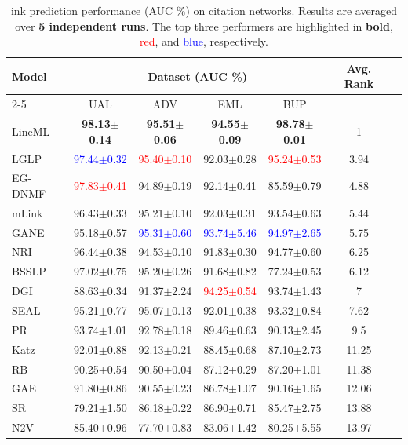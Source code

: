 \documentclass[pdflatex,sn-mathphys-num]{sn-jnl}%
\theoremstyle{thmstyleone}%
\theoremstyle{thmstyletwo}%
\theoremstyle{thmstylethree}%
\theoremstyle{plain} %
\theoremstyle{definition} %
\theoremstyle{remark} %
\theoremstyle{plain} %
\begin{document}
\newpage
\begin{table}[ht!]
\centering
\caption{ink prediction performance (AUC \%) on citation networks. Results are averaged over \textbf{5 independent runs}. The top three performers are highlighted in \textbf{bold}, \textcolor{red}{red}, and \textcolor{blue}{blue}, respectively.}
\label{tab:social_bio_results_split}
\renewcommand{\arraystretch}{1.0}
\setlength{\tabcolsep}{3.5pt}
\small
\begin{tabular}{@{}lcccccr@{}}
\toprule

\multirow{2}{*}{Model} & \multicolumn{4}{c}{Dataset (AUC \%)} & \multirow{2}{*}{Avg. Rank} \\
\cmidrule(lr){2-5}
& UAL & ADV & EML & BUP & \\
\midrule
LineML & \textbf{98.13$\pm$0.14} & \textbf{95.51$\pm$0.06} & \textbf{94.55$\pm$0.09} & \textbf{98.78$\pm$0.01} & 1 \\
LGLP & \textcolor{blue}{97.44$\pm$0.32} & \textcolor{red}{95.40$\pm$0.10} & 92.03$\pm$0.28 & \textcolor{red}{95.24$\pm$0.53} & 3.94 \\
EG-DNMF & \textcolor{red}{97.83$\pm$0.41} & 94.89$\pm$0.19 & 92.14$\pm$0.41 & 85.59$\pm$0.79 & 4.88 \\
mLink & 96.43$\pm$0.33 & 95.21$\pm$0.10 & 92.03$\pm$0.31 & 93.54$\pm$0.63 & 5.44 \\
GANE & 95.18$\pm$0.57 & \textcolor{blue}{95.31$\pm$0.60} & \textcolor{blue}{93.74$\pm$5.46} & \textcolor{blue}{94.97$\pm$2.65} & 5.75 \\
NRI & 96.44$\pm$0.38 & 94.53$\pm$0.10 & 91.83$\pm$0.30 & 94.77$\pm$0.60 & 6.25 \\
BSSLP & 97.02$\pm$0.75 & 95.20$\pm$0.26 & 91.68$\pm$0.82 & 77.24$\pm$0.53 & 6.12 \\
DGI & 88.63$\pm$0.34 & 91.37$\pm$2.24 & \textcolor{red}{94.25$\pm$0.54} & 93.74$\pm$1.43 & 7 \\
SEAL & 95.21$\pm$0.77 & 95.07$\pm$0.13 & 92.01$\pm$0.38 & 93.32$\pm$0.84 & 7.62 \\
PR & 93.74$\pm$1.01 & 92.78$\pm$0.18 & 89.46$\pm$0.63 & 90.13$\pm$2.45 & 9.5\\
Katz & 92.01$\pm$0.88 & 92.13$\pm$0.21 & 88.45$\pm$0.68 & 87.10$\pm$2.73 & 11.25 \\
RB & 90.25$\pm$0.54 & 90.50$\pm$0.04 & 87.12$\pm$0.29 & 87.20$\pm$1.01 & 11.38 \\
GAE & 91.80$\pm$0.86 & 90.55$\pm$0.23 & 86.78$\pm$1.07 & 90.16$\pm$1.65 & 12.06 \\
SR & 79.21$\pm$1.50 & 86.18$\pm$0.22 & 86.90$\pm$0.71 & 85.47$\pm$2.75 & 13.88 \\
N2V & 85.40$\pm$0.96 & 77.70$\pm$0.83 & 83.06$\pm$1.42 & 80.25$\pm$5.55 & 13.97 \\


\end{tabular}
\end{table}
\end{document}
